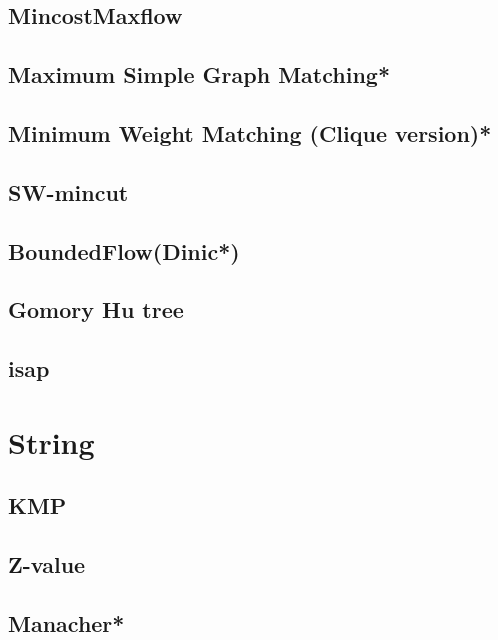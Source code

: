 \subsection{MincostMaxflow}

\subsection{Maximum Simple Graph Matching*} %

\subsection{Minimum Weight Matching (Clique version)*} %

\subsection{SW-mincut}

\subsection{BoundedFlow(Dinic*)} %

\subsection{Gomory Hu tree}

\subsection{isap}



\section{String}
\subsection{KMP}

\subsection{Z-value}

\subsection{Manacher*} %

